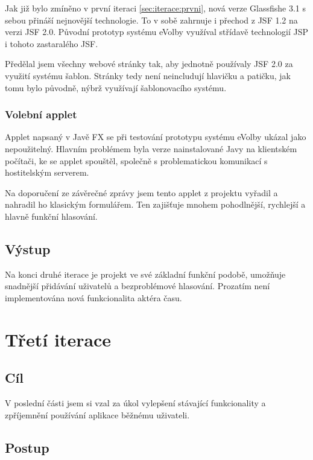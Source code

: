 \documentclass[11pt,twoside,a4paper]{book}
\begin{document}
Jak již bylo zmíněno v první iteraci \ref{sec:iterace:prvni}, nová verze Glassfishe 3.1 s sebou přináší nejnovější technologie. To v sobě zahrnuje i přechod z JSF 1.2 na verzi JSF 2.0. Původní prototyp systému eVolby\cite{www:prototyp} využíval střídavě technologií JSP i tohoto zastaralého JSF.

Předělal jsem všechny webové stránky tak, aby jednotně používaly JSF 2.0 za využití systému šablon. Stránky tedy není neincludují hlavičku a patičku, jak tomu bylo původně, nýbrž využívají šablonovacího systému.

\subsubsection{Volební applet}

Applet napsaný v Javě FX se při testování prototypu systému eVolby\cite{www:prototyp} ukázal jako nepoužitelný. Hlavním problémem byla verze nainstalované Javy na klientském počítači, ke se applet spouštěl, společně s problematickou komunikací s hostitelským serverem.

Na doporučení ze závěrečné zprávy jsem tento applet z projektu vyřadil a nahradil ho klasickým formulářem. Ten zajišťuje mnohem pohodlnější, rychlejší a hlavně funkční hlasování.

\subsection{Výstup}

Na konci druhé iterace je projekt ve své základní funkční podobě, umožňuje snadnější přidávání uživatelů a bezproblémové hlasování. Prozatím není implementována nová funkcionalita aktéra času.

\section{Třetí iterace}

\subsection{Cíl}

V poslední části jsem si vzal za úkol vylepšení stávající funkcionality a zpříjemnění používání aplikace běžnému uživateli.

\subsection{Postup}
\end{document}
